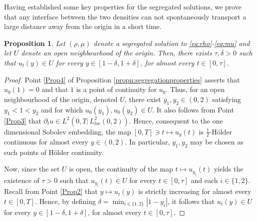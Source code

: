 \documentclass[a4paper,twosided, 11pt]{article}
\theoremstyle{plain}
\newtheorem{proposition}[thm]{Proposition}
\theoremstyle{remark}
\numberwithin{equation}{section}
\begin{document}
Having established some key properties for the segregated solutions, we prove that any interface between the two densities can not spontaneously transport a large distance away from the origin in a short time.

\begin{proposition}\label{propn:localisation}
Let $(\rho,\mu)$ denote a segregated solution to \eqref{eq:rho}-\eqref{eq:mu} and let $U$ denote an open neighbourhood of the origin.
Then, there exists $\tau,\delta > 0$ such that $u_t(y) \in U$ for every $y \in [1-\delta, 1+\delta]$, for almost every $t \in [0,\tau]$. 
 \end{proposition}
\begin{proof}
Point \ref{Prop4} of Proposition \ref{propn:segregationproperties} asserts that $u_0(1) = 0$ and that $1$ is a point of continuity for $u_0$.
Thus, for an open neighbourhood of the origin, denoted $U$, there exist $y_1, y_2 \in (0,2)$ satisfying $y_1 < 1 < y_2$ and for which $u_0(y_1),u_0(y_2) \in U$. 
It also follows from Point \ref{Prop3} that $\partial_t u \in L^2(0,T;L^2_{loc}(0,2))$. 
Hence, consequent to the one dimensional Sobolev embedding, the map $[0,T]\ni t \mapsto u_y(t)$ is $\frac{1}{2}$-H\"older continuous for almost every $y \in (0,2)$.
In particular, $y_1,y_2$ may be chosen as such points of H\"older continuity.


\medskip 

Now, since the set $U$ is open, the continuity of the map $t\mapsto u_{y_i}(t)$ yields the existence of $\tau > 0 $ such that $u_{y_i}(t) \in U $ for every $t \in [0,\tau]$ and each $i \in \{1,2\}$.
Recall from Point \ref{Prop2} that $y \mapsto u_t(y)$ is strictly increasing for almost every $t \in [0,T]$. 
Hence, by defining $\delta = \min_{i \in \{1,2\}} |1- y_i|$, it follows that $u_t(y) \in U $ for every $y \in [1-\delta, 1+\delta]$, for almost every $t \in [0,\tau]$.
\end{proof}
\end{document}
